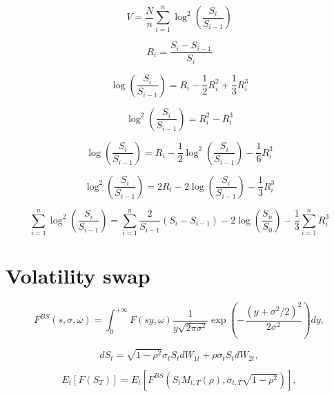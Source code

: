 \documentclass[12pt]{article}
\begin{document}
    \begin{equation}
      V = \frac{N}{n}\sum_{i=1}^n\log^2\left(\frac{S_i}{S_{i-1}}\right)
    \end{equation}

    \begin{equation}
      R_i=\frac{S_i-S_{i-1}}{S_i}
    \end{equation}

    \begin{equation}
      \log\left(\frac{S_i}{S_{i-1}}\right)=R_i-\frac{1}{2}R_i^2+\frac{1}{3}R_i^3
    \end{equation}

    \begin{equation}
      \log^2\left(\frac{S_i}{S_{i-1}}\right)=R_i^2-R_i^3
    \end{equation}

    \begin{equation}
      \log\left(\frac{S_i}{S_{i-1}}\right)=R_i-\frac{1}{2}\log^2\left(\frac{S_i}{S_{i-1}}\right)-\frac{1}{6}R_i^3
    \end{equation}

    \begin{equation}
      \log^2\left(\frac{S_i}{S_{i-1}}\right)=2R_i-2\log\left(\frac{S_i}{S_{i-1}}\right)-\frac{1}{3}R_i^3
    \end{equation}

    \begin{equation}
      \sum_{i=1}^n\log^2\left(\frac{S_i}{S_{i-1}}\right)=\sum_{i=1}^n\frac{2}{S_{i-1}}(S_i-S_{i-1})-2\log\left(\frac{S_n}{S_0}\right)-\frac{1}{3}\sum_{i=1}^nR_i^3
    \end{equation}



\section{Volatility swap}

  \begin{equation}
    F^{BS}\left(s, \sigma, \omega\right) = \int_0^{+\infty}F(sy,\omega)\frac{1}{y\sqrt{2\pi\sigma^2}}\exp\left(-\frac{\left(y+\sigma^2/2\right)^2}{2\sigma^2}\right)dy,
  \end{equation}

  \begin{equation}
    dS_t=\sqrt{1-\rho^2}\sigma_tS_tdW_{1t}+\rho\sigma_tS_tdW_{2t},
  \end{equation}

  \begin{equation}
    E_t\left[F(S_T)\right]=E_t\left[F^{BS}\left(S_tM_{t,T}(\rho),\bar\sigma_{t,T}\sqrt{1-\rho^2}\right)\right],
  \end{equation}
\end{document}
